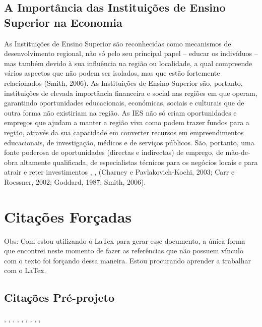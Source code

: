 
\subsection{A Importância das Instituições de Ensino Superior na Economia}

As Instituições de Ensino Superior são reconhecidas como mecanismos de desenvolvimento regional, não só pelo seu principal papel – educar os indivíduos – mas também devido à sua influência na região ou localidade, a qual compreende vários aspectos que não podem ser isolados, mas que estão fortemente relacionados (Smith, 2006)\cite{Smith2006TheSystem}. As Instituições de Ensino Superior são, portanto, instituições de elevada importância financeira e social nas regiões em que operam, garantindo oportunidades educacionais, económicas, sociais e culturais que de outra forma não existiriam na região. As IES não só criam oportunidades e empregos que ajudam a manter a região viva como podem trazer fundos para a região, através da sua capacidade em converter recursos em empreendimentos educacionais, de investigação, médicos e de serviços públicos. São, portanto, uma fonte poderosa de oportunidades (directas e indirectas) de emprego, de mão-de-obra altamente qualificada, de especialistas técnicos para os negócios locais e para atrair e reter investimentos \cite{Charney2003UniversityEconomy}, \cite{Goddard1987UniversitiesOverview}, \cite{Smith2006TheSystem} (Charney e Pavlakovich-Kochi, 2003; Carr e Roessner, 2002; Goddard, 1987; Smith, 2006).








\section{Citações Forçadas}%
 Obs: Com estou utilizando o LaTex para gerar esse documento, a única forma que encontrei neste momento de fazer as referências que não possuem vínculo com o texto foi forçando dessa maneira. Estou procurando aprender a trabalhar com o LaTex.

 \subsection{Citações Pré-projeto}
    
   \cite{Bleicher2016PoliticasFederais},%
   \cite{MarreiroBarbosa2013DesempenhoHemoglobina},%
   \cite{Santos2016ASocial},%
   \cite{SilvaMachado2012SistemaEducation},%
   \cite{CarolinaLilideAssis2013ASBRASILEIRAS},%
   \cite{HartmannLeibovich2015AvaliacaoUnB},%
   \cite{GuedesdaSilva2017EvasaoInstitucionais},%
   \cite{Antonio2017AnaliseCeara},%
   \cite{Freitas2015AvaliacaoEducacional},%
   \cite{Vieira2016AvaliacaoBrasilia}%

